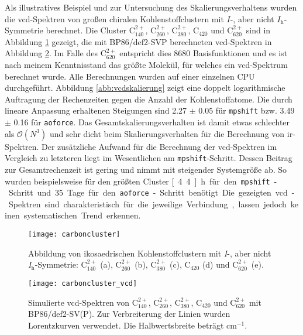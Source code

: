 \FloatBarrier
Als illustratives Beispiel und zur Untersuchung des Skalierungsverhaltens wurden die \ac{vcd}-Spektren von großen chiralen Kohlenstoffclustern mit $I$-, aber nicht $I_\textrm{h}$-Symmetrie berechnet. Die Cluster C$^{2+}_{140}$, C$^{2+}_{260}$, C$^{2+}_{380}$, C$_{420}$ und C$^{2+}_{620}$ sind in Abbildung \ref{abb:carboncluster} gezeigt, die mit BP86/def2-SVP berechneten \ac{vcd}-Spektren in Abbildung \ref{abb:carboncluster_vcd}. Im Falle des C$^{2+}_{620}$ entspricht dies 8680 Basisfunktionen und es ist nach meinem Kenntnisstand das größte Molekül, für welches ein \ac{vcd}-Spektrum berechnet wurde. Alle Berechnungen wurden auf einer einzelnen CPU durchgeführt. Abbildung \ref{abb:vcdskalierung} zeigt eine doppelt logarithmische Auftragung der Rechenzeiten gegen die Anzahl der Kohlenstoffatome. Die durch lineare Anpassung erhaltenen Steigungen sind 2.27 $\pm$ 0.05 für \texttt{mpshift} bzw. 3.49 $\pm$ 0.16 für \texttt{aoforce}. Das Gesamtskalierungsverhalten ist damit etwas schlechter als $\mathcal{O}(N^3)$ und sehr dicht beim Skalierungsverhalten für die Berechnung von \ac{ir}-Spektren. Der zusätzliche Aufwand für die Berechnung der \ac{vcd}-Spektren im Vergleich zu letzteren liegt im Wesentlichen am \texttt{mpshift}-Schritt. Dessen Beitrag zur Gesamtrechenzeit ist gering und nimmt mit steigender Systemgröße ab. So wurden beispielsweise für den größten Cluster \unit[4.4]{h} für den \texttt{mpshift}-Schritt und 35 Tage für den \texttt{aoforce}-Schritt benötigt. Die gezeigten \ac{vcd}-Spektren sind charakteristisch für die jeweilige Verbindung, lassen jedoch keinen systematischen Trend erkennen.
\begin{figure}[ht!]
	\centering
	\texttt{[image: carboncluster]}
	\captionsetup{figurewithin = chapter}
	\captionsetup{font=small, labelfont=bf}\caption[Abbildung von ikosaedrischen Kohlenstoffclustern]{Abbildung von ikosaedrischen Kohlenstoffclustern mit \textit{I}-, aber nicht \textit{I}$_\textrm{h}$-Symmetrie: C$^{2+}_{140}$ \textsf{(a)}, C$^{2+}_{260}$ \textsf{(b)}, C$^{2+}_{380}$ \textsf{(c)}, C$_{420}$ \textsf{(d)} und C$^{2+}_{620}$ \textsf{(e)}.}
\label{abb:carboncluster}
\end{figure}

\begin{figure}[ht!]
	\centering
	\texttt{[image: carboncluster\_vcd]}
	\captionsetup{figurewithin = chapter}
	\captionsetup{font=small, labelfont=bf}\caption[Simulierte \ac{vcd}-Spektren von ikosaedrischen Kohlenstoffclustern]{Simulierte \ac{vcd}-Spektren von C$^{2+}_{140}$, C$^{2+}_{260}$, C$^{2+}_{380}$, C$_{420}$ und C$^{2+}_{620}$ mit BP86/def2-SV(P). Zur Verbreiterung der Linien wurden Lorentzkurven verwendet. Die Halbwertsbreite beträgt \unit[4]{cm$^{-1}$}.}
\label{abb:carboncluster_vcd}
\end{figure}

